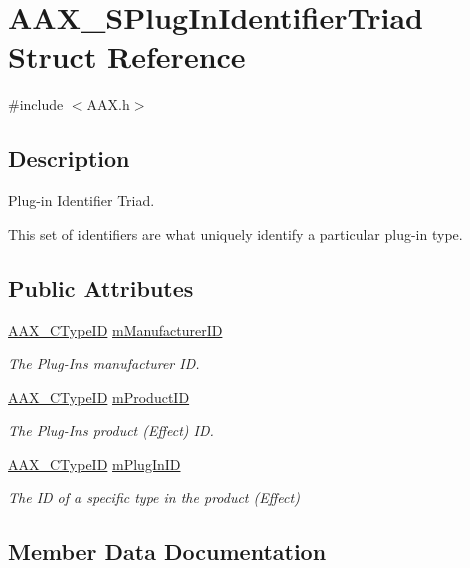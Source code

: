 \hypertarget{a01425}{}\section{A\+A\+X\+\_\+\+S\+Plug\+In\+Identifier\+Triad Struct Reference}
\label{a01425}


{\ttfamily \#include $<$A\+A\+X.\+h$>$}



\subsection{Description}
Plug-\/in Identifier Triad. 

This set of identifiers are what uniquely identify a particular plug-\/in type. \subsection*{Public Attributes}
\begin{DoxyCompactItemize}
\item 
\mbox{\hyperlink{a00392_ac678f9c1fbcc26315d209f71a147a175}{A\+A\+X\+\_\+\+C\+Type\+ID}} \mbox{\hyperlink{a01425_a996b416626b2bb8bec10294b63579d91}{m\+Manufacturer\+ID}}
\begin{DoxyCompactList}\small\item\em The Plug-\/\+In\textquotesingle{}s manufacturer ID. \end{DoxyCompactList}\item 
\mbox{\hyperlink{a00392_ac678f9c1fbcc26315d209f71a147a175}{A\+A\+X\+\_\+\+C\+Type\+ID}} \mbox{\hyperlink{a01425_a68e6bc6c424a7eabe04d52fe47c2a006}{m\+Product\+ID}}
\begin{DoxyCompactList}\small\item\em The Plug-\/\+In\textquotesingle{}s product (Effect) ID. \end{DoxyCompactList}\item 
\mbox{\hyperlink{a00392_ac678f9c1fbcc26315d209f71a147a175}{A\+A\+X\+\_\+\+C\+Type\+ID}} \mbox{\hyperlink{a01425_a7554a514df9e97e8a7c8e416165f2f59}{m\+Plug\+In\+ID}}
\begin{DoxyCompactList}\small\item\em The ID of a specific type in the product (Effect) \end{DoxyCompactList}\end{DoxyCompactItemize}


\subsection{Member Data Documentation}
\mbox{\label{a01425_a996b416626b2bb8bec10294b63579d91}} 
